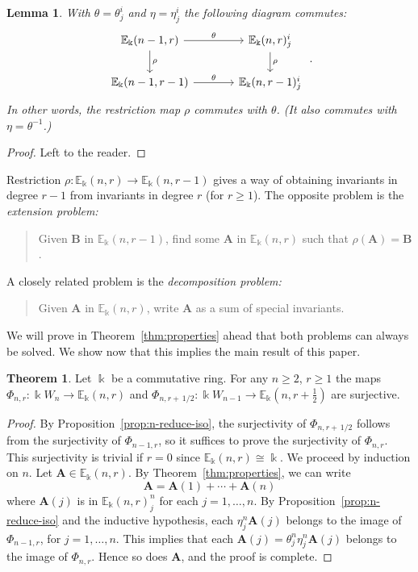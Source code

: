 \documentclass[10pt]{article}
\newtheorem{lemm}[theorem]{Lemma}
\theoremstyle{definition}
\newtheorem{theo}[theorem]{Theorem}
\newcommand{\E}{\mathbb{E}}
\newcommand{\bA}{\mathbf{A}}
\newcommand{\bB}{\mathbf{B}}
\newcommand{\half}{\, 1/2} %
\newcommand{\fhalf}{\frac{1}{2}} %
\begin{document}
\begin{lemm}\label{lem:theta-rho-commute}
 With $\theta = \theta^i_j$ and $\eta = \eta^i_j$ the
 following diagram commutes:
 \[
 \begin{tikzcd}[column sep = large]
 \E_\Bbbk(n-1,r) \arrow{r}{\theta} \arrow{d}{\rho}
 & \E_\Bbbk(n,r)^i_j \arrow{d}{\rho}\\
 \E_\Bbbk(n-1,r-1) \arrow{r}{\theta}& \E_\Bbbk(n,r-1)^i_j 
 \end{tikzcd} \; .
 \]
 In other words, the restriction map $\rho$ commutes with $\theta$.
 \textup{(}It also commutes with $\eta = \theta^{-1}$.\textup{)}
\end{lemm}


\begin{proof}
Left to the reader.
\end{proof}


Restriction $\rho: \E_\Bbbk(n,r) \to \E_\Bbbk(n,r-1)$ gives a way of
obtaining invariants in degree $r-1$ from invariants in degree $r$
(for $r\ge 1$). The opposite problem is the \emph{extension problem:}
\begin{quote}
 Given $\bB$ in $\E_\Bbbk(n,r-1)$, find some $\bA$ in $\E_\Bbbk(n,r)$
 such that $\rho(\bA) = \bB$.
\end{quote}
A closely related problem is the \emph{decomposition problem:}
\begin{quote}
 Given $\bA$ in $\E_\Bbbk(n,r)$, write $\bA$ as a sum of special
 invariants.
\end{quote}
We will prove in Theorem~\ref{thm:properties} ahead that both problems
can always be solved. We show now that this implies the main result of
this paper.



\begin{theo}\label{thm:main1}
 Let $\Bbbk$ be a commutative ring. For any $n \ge 2$, $r \ge
 1$ the maps $\Phi_{n,r}: \Bbbk W_n \to \E_\Bbbk(n,r)$ and
 $\Phi_{n,r+\half}: \Bbbk W_{n-1} \to \E_\Bbbk(n,r+\fhalf)$ are
 surjective.
\end{theo}


\begin{proof}
By Proposition~\ref{prop:n-reduce-iso}, the surjectivity of
$\Phi_{n,r+\half}$ follows from the surjectivity of $\Phi_{n-1,r}$, so
it suffices to prove the surjectivity of $\Phi_{n,r}$. This
surjectivity is trivial if $r=0$ since $\E_\Bbbk(n,r) \cong \Bbbk$. We
proceed by induction on $n$. Let $\bA \in \E_\Bbbk(n,r)$. By Theorem~\ref{thm:properties}, we can write
\[
\bA = \bA(1) + \cdots + \bA(n)
\]
where $\bA(j)$ is in $\E_\Bbbk(n,r)^n_j$ for each $j = 1, \dots,
n$. By Proposition~\ref{prop:n-reduce-iso} and the inductive
hypothesis, each $\eta^n_j \bA(j)$ belongs to the image of
$\Phi_{n-1,r}$, for $j = 1, \dots, n$. This implies that each $\bA(j)
= \theta^n_j \eta^n_j \bA(j)$ belongs to the image of
$\Phi_{n,r}$. Hence so does $\bA$, and the proof is complete.
\end{proof}
\end{document}
